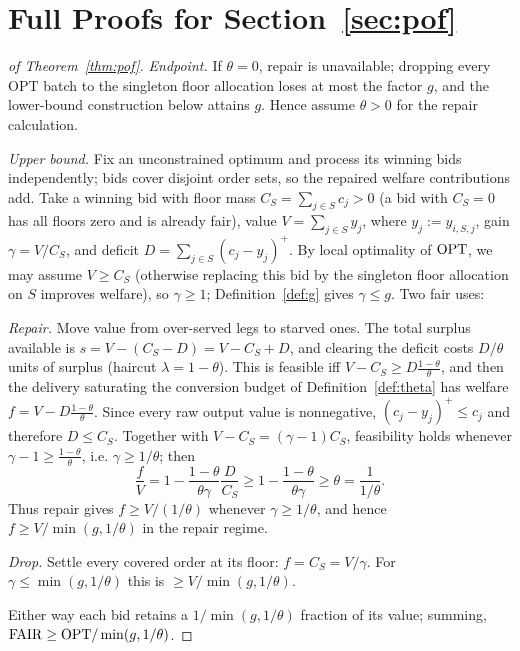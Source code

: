 \section{Full Proofs for Section~\ref{sec:pof}}

\begin{proof}[of Theorem~\ref{thm:pof}]
\emph{Endpoint.} If $\theta=0$, repair is unavailable; dropping every OPT
batch to the singleton floor allocation loses at most the factor $g$, and
the lower-bound construction below attains $g$. Hence assume $\theta>0$
for the repair calculation.

\emph{Upper bound.} Fix an unconstrained optimum and process its winning
bids independently; bids cover disjoint order sets, so the repaired
welfare contributions add. Take a winning bid with floor mass $C_S=\sum_{j\in S}c_j>0$
(a bid with $C_S=0$ has all floors zero and is already fair), value
$V=\sum_{j\in S}y_j$, where $y_j:=y_{i,S,j}$, gain
$\gamma=V/C_S$, and deficit $D=\sum_{j\in S}(c_j-y_j)^+$. By local
optimality of $\mathrm{OPT}$, we may assume $V\ge C_S$ (otherwise replacing this
bid by the singleton floor allocation on $S$ improves welfare), so
$\gamma\ge1$; Definition~\ref{def:g} gives $\gamma\le g$. Two fair uses:

\emph{Repair.} Move value from over-served legs to starved ones. The
total surplus available is $s=V-(C_S-D)=V-C_S+D$, and clearing the
deficit costs $D/\theta$ units of surplus (haircut $\lambda=1-\theta$).
This is feasible iff $V-C_S\ge D\frac{1-\theta}{\theta}$, and then the
delivery saturating the conversion budget of Definition~\ref{def:theta}
has welfare $f=V-D\frac{1-\theta}{\theta}$. Since every raw output
value is nonnegative, $(c_j-y_j)^+\le c_j$ and therefore $D\le C_S$.
Together with $V-C_S=(\gamma-1)C_S$, feasibility holds whenever
$\gamma-1\ge\frac{1-\theta}{\theta}$, i.e. $\gamma\ge1/\theta$; then
\[
  \frac{f}{V}
  =1-\frac{1-\theta}{\theta\gamma}\frac{D}{C_S}
  \ge 1-\frac{1-\theta}{\theta\gamma}
  \ge \theta
  = \frac{1}{1/\theta}.
\]
Thus repair gives $f\ge V/(1/\theta)$ whenever $\gamma\ge1/\theta$, and
hence $f\ge V/\!\min(g,1/\theta)$ in the repair regime.

\emph{Drop.} Settle every covered order at its floor: $f=C_S=V/\gamma$.
For $\gamma\le\min(g,1/\theta)$ this is $\ge V/\!\min(g,1/\theta)$.

Either way each bid retains a $1/\min(g,1/\theta)$ fraction of its value;
summing, $\mathrm{FAIR}\ge\mathrm{OPT}/\min(g,1/\theta)$.


\end{proof}
